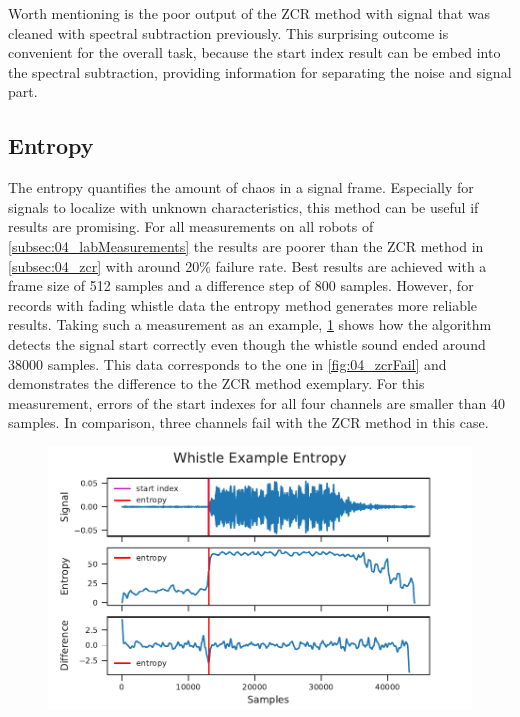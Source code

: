 Worth mentioning is the poor output of the \ac{ZCR} method with
signal that was cleaned with spectral subtraction previously.
This surprising outcome is convenient for the overall task,
because the start index result can be embed into the spectral
subtraction, providing information for separating the noise
and signal part.

\subsection{Entropy}
\label{subsec:04_entropy}

The entropy quantifies the amount of chaos in a signal frame.
Especially for signals to localize with unknown characteristics,
this method can be useful if results are promising.
For all measurements on all robots of \cref{subsec:04_labMeasurements}
the results are poorer than the \ac{ZCR} method in \cref{subsec:04_zcr}
with around 20\si{\percent} failure rate.
Best results are achieved with a frame size of 512 samples and a difference
step of 800 samples. 
However, for records with fading whistle data the entropy method
generates more reliable results.
Taking such a measurement as an example, \cref{fig:04_entropyGood}
shows how the algorithm detects the signal start correctly even though
the whistle sound ended around 38000 samples.
This data corresponds to the one in \cref{fig:04_zcrFail} and demonstrates
the difference to the \ac{ZCR} method exemplary.
For this measurement, errors of the start indexes for all four channels
are smaller than 40 samples.
In comparison, three channels fail with the \ac{ZCR} method in this case.
\begin{figure}[ht]
	\centering
		\includegraphics[]{figures/evaluation/entropy_good}
    \caption{}
	\label{fig:04_entropyGood}
\end{figure}

